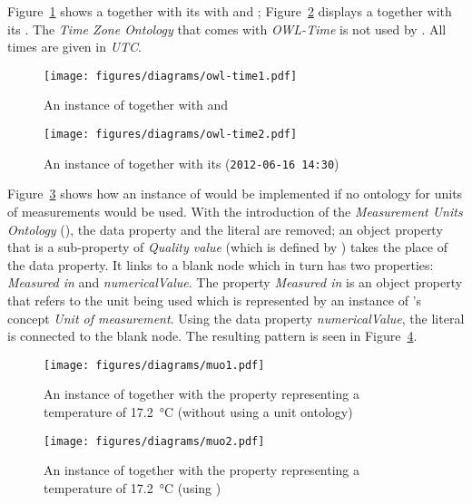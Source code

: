 Figure~\ref{fig:owl_time1} shows a  together with its with  and ; Figure~\ref{fig:owl_time2} displays a  together with its . The \emph{Time Zone Ontology} that comes with \emph{OWL-Time} is not used by \smarthomeweather. All times are given in \emph{UTC}.

\begin{figure}
  \centering
  \texttt{[image: figures/diagrams/owl-time1.pdf]}
  \caption{An instance of  together with  and }
  \label{fig:owl_time1}
\end{figure}

\begin{figure}
  \centering
  \texttt{[image: figures/diagrams/owl-time2.pdf]}
  \caption{An instance of  together with its  (\texttt{2012-06-16~14:30})}
  \label{fig:owl_time2}
\end{figure}

\vspace{1em}

Figure~\ref{fig:muo1} shows how an instance of  would be implemented if no ontology for units of measurements would be used. With the introduction of the \emph{Measurement Units Ontology} (\muo), the data property and the literal are removed; an object property that is a sub-property of \emph{Quality value} (which is defined by \muo) takes the place of the data property. It links to a blank node which in turn has two properties: \emph{Measured in} and \emph{numericalValue}. The property \emph{Measured in} is an object property that refers to the unit being used which is represented by an instance of \muo's concept \emph{Unit of measurement}. Using the data property \emph{numericalValue}, the literal is connected to the blank node. The resulting pattern is seen in Figure~\ref{fig:muo2}.

\begin{figure}
  \centering
  \texttt{[image: figures/diagrams/muo1.pdf]}
  \caption{An instance of  together with the property  representing a temperature of \SI{17.2}{\celsius} (without using a unit ontology)}
  \label{fig:muo1}
\end{figure}

\begin{figure}
  \centering
  \texttt{[image: figures/diagrams/muo2.pdf]}
  \caption{An instance of  together with the property  representing a temperature of \SI{17.2}{\celsius} (using \muo)}
  \label{fig:muo2}
\end{figure}

